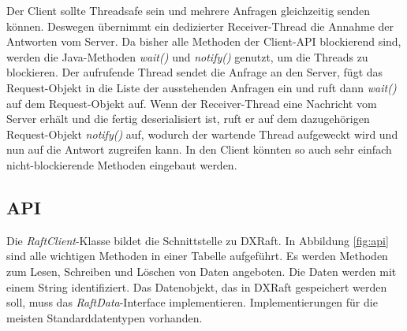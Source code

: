 Der Client sollte Threadsafe sein und mehrere Anfragen gleichzeitig senden können. Deswegen übernimmt ein dedizierter Receiver-Thread die Annahme der Antworten vom Server. Da bisher alle Methoden der Client-API blockierend sind, werden die Java-Methoden \textit{wait()} und  \textit{notify()} genutzt, um die Threads zu blockieren. Der aufrufende Thread sendet die Anfrage an den Server, fügt das Request-Objekt in die Liste der ausstehenden Anfragen ein und ruft dann \textit{wait()} auf dem Request-Objekt auf. Wenn der Receiver-Thread eine Nachricht vom Server erhält und die fertig deserialisiert ist, ruft er auf dem dazugehörigen Request-Objekt \textit{notify()} auf, wodurch der wartende Thread aufgeweckt wird und nun auf die Antwort zugreifen kann. In den Client könnten so auch sehr einfach nicht-blockierende Methoden eingebaut werden.

\subsection{API}
\label{api}

Die \textit{RaftClient}-Klasse bildet die Schnittstelle zu DXRaft. In Abbildung \ref{fig:api} sind alle wichtigen Methoden in einer Tabelle aufgeführt. Es werden Methoden zum Lesen, Schreiben und Löschen von Daten angeboten. Die Daten werden mit einem String identifiziert. Das Datenobjekt, das in DXRaft gespeichert werden soll, muss das \textit{RaftData}-Interface implementieren. Implementierungen für die meisten Standarddatentypen vorhanden. 

